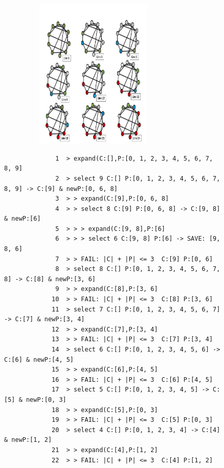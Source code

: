 \documentclass{l4proj}
\begin{document}
\begin{figure}
\centering
\includegraphics[height=7.2cm,width=9.2cm]{mcTrace.pdf}
\begin{scriptsize}
\begin{verbatim}
              1  > expand(C:[],P:[0, 1, 2, 3, 4, 5, 6, 7, 8, 9]
              2  > select 9 C:[] P:[0, 1, 2, 3, 4, 5, 6, 7, 8, 9] -> C:[9] & newP:[0, 6, 8]
              3  > > expand(C:[9],P:[0, 6, 8]
              4  > > select 8 C:[9] P:[0, 6, 8] -> C:[9, 8] & newP:[6]
              5  > > > expand(C:[9, 8],P:[6]
              6  > > > select 6 C:[9, 8] P:[6] -> SAVE: [9, 8, 6]
              7  > > FAIL: |C| + |P| <= 3  C:[9] P:[0, 6]
              8  > select 8 C:[] P:[0, 1, 2, 3, 4, 5, 6, 7, 8] -> C:[8] & newP:[3, 6]
              9  > > expand(C:[8],P:[3, 6]
             10  > > FAIL: |C| + |P| <= 3  C:[8] P:[3, 6]
             11  > select 7 C:[] P:[0, 1, 2, 3, 4, 5, 6, 7] -> C:[7] & newP:[3, 4]
             12  > > expand(C:[7],P:[3, 4]
             13  > > FAIL: |C| + |P| <= 3  C:[7] P:[3, 4]
             14  > select 6 C:[] P:[0, 1, 2, 3, 4, 5, 6] -> C:[6] & newP:[4, 5]
             15  > > expand(C:[6],P:[4, 5]
             16  > > FAIL: |C| + |P| <= 3  C:[6] P:[4, 5]
             17  > select 5 C:[] P:[0, 1, 2, 3, 4, 5] -> C:[5] & newP:[0, 3]
             18  > > expand(C:[5],P:[0, 3]
             19  > > FAIL: |C| + |P| <= 3  C:[5] P:[0, 3]
             20  > select 4 C:[] P:[0, 1, 2, 3, 4] -> C:[4] & newP:[1, 2]
             21  > > expand(C:[4],P:[1, 2]
             22  > > FAIL: |C| + |P| <= 3  C:[4] P:[1, 2]

\end{verbatim}
\end{scriptsize}
\end{figure}
\end{document}
